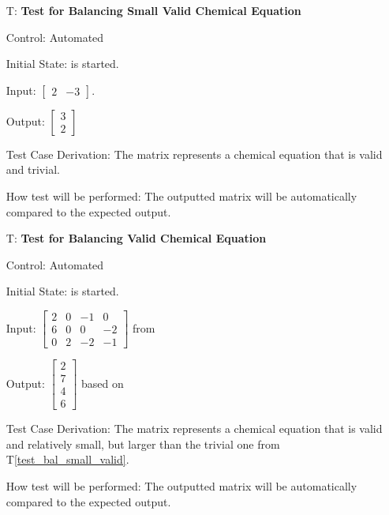 \documentclass[12pt, titlepage]{article}
\newcounter{testnum} %
\newcommand{\testref}[1]{T\ref{#1}}
\begin{document}
\begin{enumerate}

  \item[T\refstepcounter{testnum}\thetestnum \label{test_bal_small_valid}:]
    \textbf{Test for Balancing Small Valid Chemical Equation}

    Control: Automated

    Initial State: \progname{} is started.

    Input: $\begin{bmatrix}
        2 & -3
      \end{bmatrix}$.

    Output: $\begin{bmatrix}
        3 \\
        2
      \end{bmatrix}$

    Test Case Derivation: The matrix represents a chemical equation that is
    valid and trivial.

    How test will be performed: The outputted matrix will be automatically
    compared to the expected output.

  \item[T\refstepcounter{testnum}\thetestnum \label{test_bal_valid}:]
    \textbf{Test for Balancing Valid Chemical Equation}

    Control: Automated

    Initial State: \progname{} is started.

    Input:
    $\begin{bmatrix}
        2 & 0 & -1 & 0  \\
        6 & 0 & 0  & -2 \\
        0 & 2 & -2 & -1
      \end{bmatrix}$ from \cite{hamid_balancing_2019}

    Output: $\begin{bmatrix}
        2 \\
        7 \\
        4 \\
        6
      \end{bmatrix}$ based on \cite{hamid_balancing_2019}

    Test Case Derivation: The matrix represents a chemical equation that is
    valid and relatively small, but larger than the trivial one from
    \testref{test_bal_small_valid}.

    How test will be performed: The outputted matrix will be automatically
    compared to the expected output.


\end{enumerate}
\end{document}

